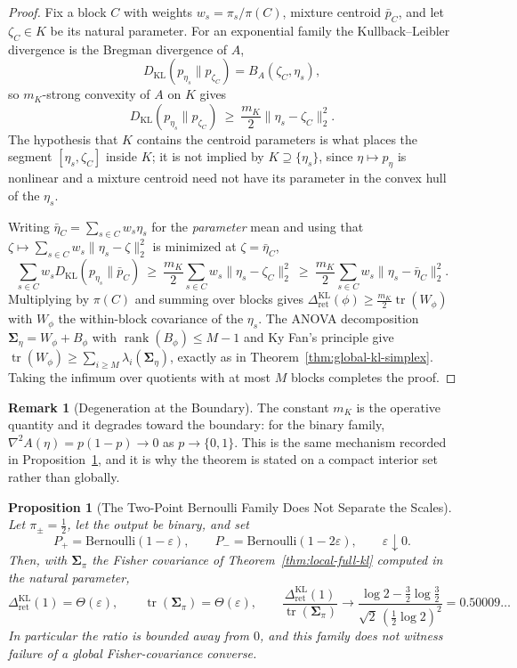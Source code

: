 \documentclass[12pt]{article}
\newtheorem{proposition}[theorem]{Proposition}
\theoremstyle{definition}
\newtheorem{remark}[theorem]{Remark}
\DeclareMathOperator{\rank}{rank}
\DeclareMathOperator{\tr}{tr}
\newcommand{\RetKL}{\Delta_{\mathrm{ret}}^{\mathrm{KL}}}
\begin{document}
\begin{proof}
Fix a block $C$ with weights $w_s=\pi_s/\pi(C)$, mixture centroid $\bar p_C$,
and let $\zeta_C\in K$ be its natural parameter.  For an exponential family the
Kullback--Leibler divergence is the Bregman divergence of $A$,
\[
D_{\mathrm{KL}}(p_{\eta_s}\|p_{\zeta_C})=B_A(\zeta_C,\eta_s),
\]
so $m_K$-strong convexity of $A$ on $K$ gives
\[
D_{\mathrm{KL}}(p_{\eta_s}\|p_{\zeta_C})\ \ge\ \frac{m_K}{2}\|\eta_s-\zeta_C\|_2^2 .
\]
The hypothesis that $K$ contains the centroid parameters is what places the
segment $[\eta_s,\zeta_C]$ inside $K$; it is not implied by $K\supseteq
\{\eta_s\}$, since $\eta\mapsto p_\eta$ is nonlinear and a mixture centroid
need not have its parameter in the convex hull of the $\eta_s$.

Writing $\bar\eta_C=\sum_{s\in C}w_s\eta_s$ for the \emph{parameter} mean and
using that $\zeta\mapsto\sum_{s\in C}w_s\|\eta_s-\zeta\|_2^2$ is minimized at
$\zeta=\bar\eta_C$,
\[
\sum_{s\in C}w_s D_{\mathrm{KL}}(p_{\eta_s}\|\bar p_C)
\ \ge\
\frac{m_K}{2}\sum_{s\in C}w_s\|\eta_s-\zeta_C\|_2^2
\ \ge\
\frac{m_K}{2}\sum_{s\in C}w_s\|\eta_s-\bar\eta_C\|_2^2 .
\]
Multiplying by $\pi(C)$ and summing over blocks gives
$\RetKL(\phi)\ge\frac{m_K}{2}\tr(W_\phi)$ with $W_\phi$ the within-block
covariance of the $\eta_s$.  The ANOVA decomposition
$\bm{\Sigma}_\eta=W_\phi+B_\phi$ with $\rank(B_\phi)\le M-1$ and Ky Fan's principle
\cite{kyfan1951} give $\tr(W_\phi)\ge\sum_{i\ge M}\lambda_i(\bm{\Sigma}_\eta)$,
exactly as in Theorem~\ref{thm:global-kl-simplex}.  Taking the infimum over
quotients with at most $M$ blocks completes the proof.
\end{proof}

\begin{remark}[Degeneration at the Boundary]
\label{rem:interior-fisher-boundary}
The constant $m_K$ is the operative quantity and it degrades toward the
boundary: for the binary family, $\nabla^2A(\eta)=p(1-p)\to0$ as
$p\to\{0,1\}$.  This is the same mechanism recorded in
Proposition~\ref{prop:bernoulli-fisher-scales}, and it is why the theorem is
stated on a compact interior set rather than globally.
\end{remark}

\begin{proposition}[The Two-Point Bernoulli Family Does Not Separate the Scales]
\label{prop:bernoulli-fisher-scales}
Let $\pi_\pm=\tfrac12$, let the output be binary, and set
\[
P_+=\mathrm{Bernoulli}(1-\varepsilon),
\qquad
P_-=\mathrm{Bernoulli}(1-2\varepsilon),
\qquad
\varepsilon\downarrow0 .
\]
Then, with $\bm{\Sigma}_\pi$ the Fisher covariance of
Theorem~\ref{thm:local-full-kl} computed in the natural parameter,
\[
\RetKL(1)=\Theta(\varepsilon),
\qquad
\tr(\bm{\Sigma}_\pi)=\Theta(\varepsilon),
\qquad
\frac{\RetKL(1)}{\tr(\bm{\Sigma}_\pi)}
\longrightarrow
\frac{\log2-\tfrac32\log\tfrac32}{\sqrt2\,(\tfrac12\log2)^2}
=
0.50009\ldots
\]
In particular the ratio is bounded away from $0$, and this family does
\emph{not} witness failure of a global Fisher-covariance converse.
\end{proposition}
\end{document}
